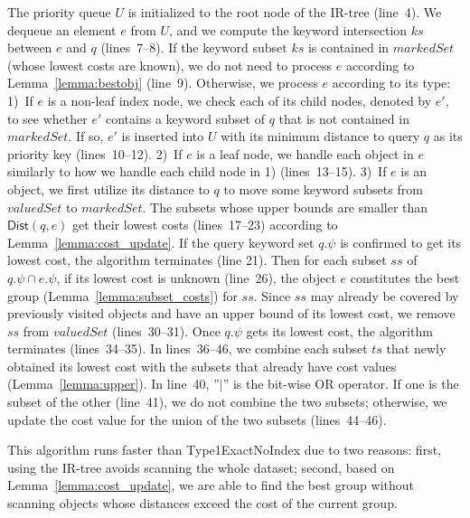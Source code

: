 \documentclass{sig-alternate}
\newcommand{\Dist}{\mbox{$\mathsf{Dist}$}\xspace}
\begin{document}
The priority queue $U$ is initialized to the root node of the IR-tree (line~4).
%
We dequeue an element $e$ from $U$, and we compute the keyword
intersection $ks$ between $e$ and $q$ (lines~7--8). If the
keyword subset $ks$ is contained in $markedSet$ (whose lowest costs are known), we
do not need to process $e$ according to Lemma~\ref{lemma:bestobj}
(line~9). Otherwise, we process $e$ according to its type:
%
1)~If $e$ is a non-leaf index node, we check each of its child
nodes, denoted by $e'$, to see whether $e'$ contains a keyword subset of
$q$ that is not contained in $markedSet$. If so,  $e'$ is inserted into $U$ with its
minimum distance to query $q$ as its priority key (lines~10--12).
%
2)~If $e$ is a leaf node, we handle each object in $e$ similarly to how
we handle each child node in 1) (lines~13--15).
%
3)~If $e$ is an object, we first utilize its distance to $q$ to move
some keyword subsets from $valuedSet$ to $markedSet$. The subsets
whose upper bounds are smaller than $\Dist(q, e)$
get their lowest costs (lines~17--23) according to
Lemma~\ref{lemma:cost_update}. If the query keyword set $q.\psi$ is
confirmed to get its lowest cost, the algorithm terminates (line
21).
%
Then for each subset $ss$ of $q.\psi \cap \mathit{e}.\psi$, if its
lowest cost is unknown (line~26), the object $e$ constitutes the
best group (Lemma~\ref{lemma:subset_costs}) for
$ss$. Since $ss$ may already be covered by previously visited
objects and have an upper bound of its lowest cost, we remove $ss$
from $valuedSet$ (lines~30--31). Once $q.\psi$ gets its lowest cost,
the algorithm terminates (lines~34--35).
%
In lines~36--46, we combine each subset $ts$ that newly obtained
its lowest cost with the subsets that already have cost values
(Lemma~\ref{lemma:upper}). In line~40, ''$|$'' is the bit-wise OR
operator. If one is the subset of the other (line~41), we do not
combine the two subsets; otherwise, we update the cost value for the union
of the two subsets (lines~44--46).


This algorithm runs faster than \textsf{Type1ExactNoIndex} due to
two reasons: first, using the IR-tree avoids scanning the
whole dataset; second, based on Lemma~\ref{lemma:cost_update}, we
are able to find the best group without scanning objects whose
distances exceed the cost of the current group.

\end{document}
